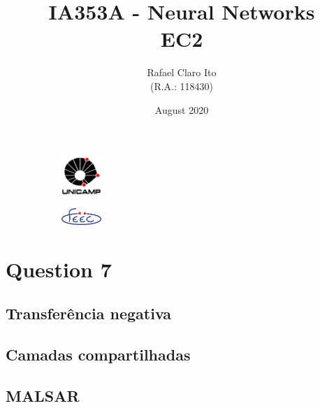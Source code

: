 \documentclass[a4paper]{article}    %
\begin{document}
\begin{figure}
    \centering
    \begin{subfigure}{0.45\textwidth}
        \centering
        \includegraphics[width=1.5cm]{unicamp}
    \end{subfigure}
    \hfill
    \begin{subfigure}{0.45\textwidth}
        \centering
        \includegraphics[width=1.5cm]{feec}
    \end{subfigure}
\end{figure}

\title{
    \vspace{5cm}
    IA353A - Neural Networks\\
    EC2
    \vspace{1cm}
}
\author{
    Rafael Claro Ito\\
    (R.A.: 118430)
    \vspace{11cm}
}
\date{August 2020}
\maketitle
\newpage

\setcounter{section}{7}
\section*{Question 7}

\subsection{Transferência negativa}

\subsection{Camadas compartilhadas}

\subsection{MALSAR}
\end{document}
